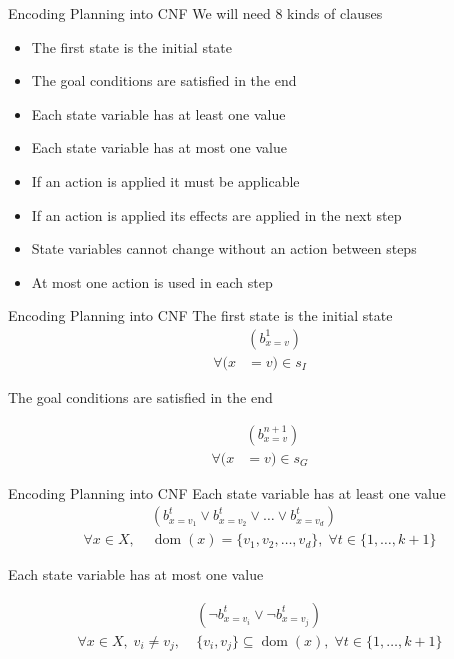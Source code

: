 \documentclass[t]{sdqbeamer}
\begin{document}
\begin{frame}{Encoding Planning into CNF}
We will need 8 kinds of clauses
\begin{itemize}
	\item The first state is the initial state
	\item The goal conditions are satisfied in the end
	\item Each state variable has at least one value
	\item Each state variable has at most one value
	\item If an action is applied it must be applicable
	\item If an action is applied its effects are applied in the next step
	\item State variables cannot change without an action between steps
	\item At most one action is used in each step
\end{itemize}
\end{frame}



\begin{frame}{Encoding Planning into CNF}
The first state is the initial state
\begin{equation}
\begin{split}
&(b_{x=v}^1) \\
\forall (x&=v) \in s_I
\end{split}
\end{equation}

The goal conditions are satisfied in the end

\begin{equation}
\begin{split}
&(b_{x=v}^{n+1}) \\
\forall (x&=v) \in s_G
\end{split}
\end{equation}
\end{frame}

\begin{frame}{Encoding Planning into CNF}
Each state variable has at least one value
\begin{equation}
\label{eq2-1}
\begin{split}
&(b_{x=v_1}^t \vee b_{x=v_2}^t \vee \dots \vee b_{x=v_d}^t) \\
\forall x \in X,\; &\operatorname{dom}(x)=\{v_1, v_2, \dots, v_d\},\; \forall t \in \{1,\dots,k+1\}
\end{split}
\end{equation}

Each state variable has at most one value

\begin{equation}
\label{eq2-2}
\begin{split}
&(\neg b_{x=v_i}^t \vee \neg b_{x=v_j}^t)\\
\forall x \in X,\; v_i \neq v_j,\;& \{v_i,v_j\} \subseteq \operatorname{dom}(x),\; \forall t \in \{1,\dots,k+1\}
\end{split}
\end{equation}
\end{frame}
\end{document}

